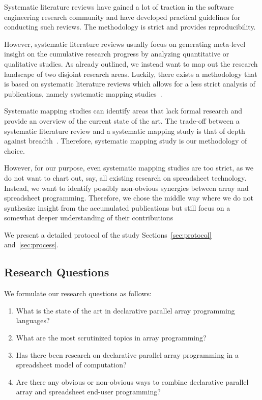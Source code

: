 \documentclass[a4paper]{article}
\begin{document}
Systematic literature reviews have gained a lot of traction in the
software engineering research community and
\citet{keele2007guidelines} have developed practical guidelines for
conducting such reviews. The methodology is strict and provides
reproducibility.

However, systematic literature reviews usually focus on generating
meta-level insight on the cumulative research progress by analyzing
quantitative or qualitative studies. As already outlined, we instead
want to map out the research landscape of two disjoint research
areas. Luckily, there exists a methodology that is based on systematic
literature reviews which allows for a less strict analysis of
publications, namely systematic mapping
studies~\cite{petersen2008systematic}.

Systematic mapping studies can identify areas that lack formal
research and provide an overview of the current state of the art. The
trade-off between a systematic literature review and a systematic
mapping study is that of depth against
breadth~\cite{keele2007guidelines, petersen2008systematic}. Therefore,
systematic mapping study is our methodology of choice.

However, for our purpose, even systematic mapping studies are too
strict, as we do not want to chart out, say, all existing research on
spreadsheet technology. Instead, we want to identify possibly
non-obvious synergies between array and spreadsheet
programming. Therefore, we chose the middle way where we do not
synthesize insight from the accumulated publications but still focus
on a somewhat deeper understanding of their contributions

We present a detailed protocol of the study
Sections~\ref{sec:protocol} and~\ref{sec:process}.

\subsection{Research Questions}
\label{sec:research-questions}

We formulate our research questions as follows:

\begin{enumerate}
\item What is the state of the art in declarative parallel array
  programming languages?
\item What are the most scrutinized topics in array programming?
\item Has there been research on declarative parallel array
  programming in a spreadsheet model of computation?
\item Are there any obvious or non-obvious ways to combine declarative
  parallel array and spreadsheet end-user programming?
\end{enumerate}
\end{document}
